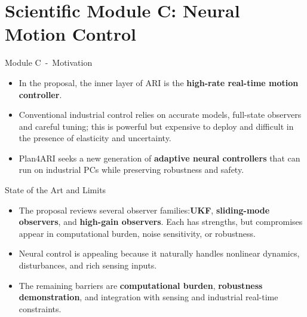 \documentclass[aspectratio=169,10pt]{beamer}
\begin{document}
\section{Scientific Module C: Neural Motion Control}

\begin{frame}{Module C~-~Motivation}

\begin{itemize}
  \item In the proposal, the inner layer of ARI is the \textbf{high-rate real-time motion controller}.
  \item Conventional industrial control relies on accurate models, full-state observers and careful tuning; this is powerful but expensive to deploy and difficult in the presence of elasticity and uncertainty.
  \item Plan4ARI seeks a new generation of \textbf{adaptive neural controllers} that can run on industrial PCs while preserving robustness and safety.
\end{itemize}

\end{frame}


\begin{frame}{State of the Art and Limits}

\small
\begin{itemize}
  \item The proposal reviews several observer families:\@\textbf{UKF}, \textbf{sliding-mode observers}, and \textbf{high-gain observers}. Each has strengths, but compromises appear in computational burden, noise sensitivity, or robustness.
  \item Neural control is appealing because it naturally handles nonlinear dynamics, disturbances, and rich sensing inputs.
  \item The remaining barriers are \textbf{computational burden}, \textbf{robustness demonstration}, and integration with sensing and industrial real-time constraints.
\end{itemize}

\end{frame}
\end{document}
